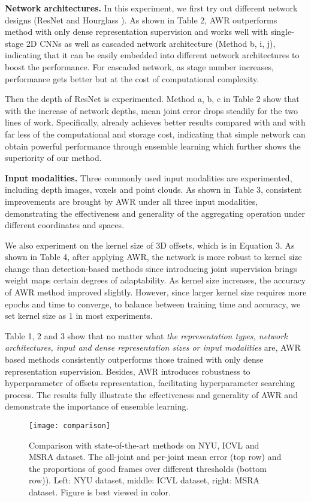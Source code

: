 \documentclass[letterpaper]{article} \usepackage{aaai20}  \usepackage{times}  \usepackage{helvet} \usepackage{courier}  \usepackage[hyphens]{url}  \usepackage{graphicx} \usepackage{amsmath}
\begin{document}
\textbf{Network architectures.} In this experiment, we first try out different network designs (ResNet \cite{resnet} and Hourglass \cite{hourglass}). As shown in Table 2, AWR outperforms method with only dense representation supervision and works well with single-stage 2D CNNs as well as cascaded network architecture (Method b, i, j), indicating that it can be easily embedded into different network architectures to boost the performance. For cascaded network, as stage number increases, performance gets better but at the cost of computational complexity. 

Then the depth of ResNet is experimented. Method a, b, c in Table 2 show that with the increase of network depths, mean joint error drops steadily for the two lines of work. Specifically,  already achieves better results compared with  and  with far less of the computational and storage cost, indicating that simple network can obtain powerful performance through ensemble learning which further shows the superiority of our method. 

\textbf{Input modalities.} Three commonly used input modalities are experimented, including depth images, voxels and point clouds. As shown in Table 3, consistent improvements are brought by AWR under all three input modalities, demonstrating the effectiveness and generality of the aggregating operation under different coordinates and spaces.

We also experiment on the kernel size of 3D offsets, which is  in Equation 3. As shown in Table 4, after applying AWR, the network is more robust to kernel size change than detection-based methods since introducing joint supervision brings weight maps certain degrees of adaptability. As kernel size increases, the accuracy of AWR method improved slightly. However, since larger kernel size requires more epochs and time to converge, to balance between training time and accuracy, we set kernel size as 1 in most experiments.

Table 1, 2 and 3 show that no matter what \textit{the representation types, network architectures, input and dense representation sizes or input modalities} are, AWR based methods consistently outperforms those trained with only dense representation supervision. Besides, AWR introduces robustness to hyperparameter of offsets representation, facilitating hyperparameter searching process. The results fully illustrate the effectiveness and generality of AWR and demonstrate the importance of ensemble learning. 


\begin{figure*}[t]
\centering
\texttt{[image: comparison]} 
\caption{Comparison with state-of-the-art methods on NYU, ICVL and MSRA dataset. The all-joint and per-joint mean error (top row) and the proportions of good frames over different thresholds (bottom row)). Left: NYU dataset, middle: ICVL dataset, right: MSRA dataset. Figure is best viewed in color.}
\end{figure*}
\end{document}
